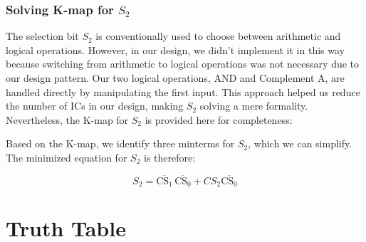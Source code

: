 \documentclass{article}
\begin{document}
\subsubsection{Solving K-map for $S_2$}
The selection bit $S_2$ is conventionally used to choose between arithmetic and logical operations. However, in our design, we didn't implement it in this way because switching from arithmetic to logical operations was not necessary due to our design pattern. Our two logical operations, AND and Complement A, are handled directly by manipulating the first input. This approach helped us reduce the number of ICs in our design, making $S_2$ solving a mere formality. Nevertheless, the K-map for $S_2$ is provided here for completeness:
\begin{center}

\end{center}
Based on the K-map, we identify three minterms for $S_2$, which we can simplify. The minimized equation for $S_2$ is therefore:
\begin{center}
    $$
        S_2 = \overline{\text{CS}_1} \, \overline{\text{CS}_0}+{{CS}_2}\overline{\text{CS}_0}
    $$
\end{center}

\pagebreak

        
  \section{Truth Table}
\end{document}
